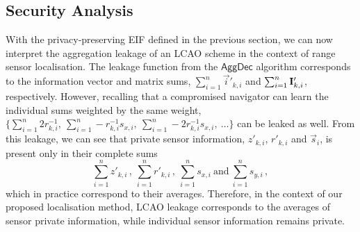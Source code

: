 \subsection{Security Analysis}\label{subsec:nonlin_fusion:security}
With the privacy-preserving EIF defined in the previous section, we can now interpret the aggregation leakage of an LCAO scheme in the context of range sensor localisation. The leakage function from the $\mathsf{AggDec}$ algorithm corresponds to the information vector and matrix sums, $\sum_{i=1}^n\vec{i}'_{k,i}$ and $\sum_{i=1}^n{{\mathbf{I}}}'_{k,i}$, respectively. However, recalling that a compromised navigator can learn the individual sums weighted by the same weight, $\{\sum_{i=1}^n2r^{-1}_{k,i},\ \sum_{i=1}^n-r^{-1}_{k,i}s_{x,i},\ \sum_{i=1}^n-2r^{-1}_{k,i}s_{x,i},\ \dots\}$ can be leaked as well. From this leakage, we can see that private sensor information, $z'_{k,i}$, $r'_{k,i}$ and $\vec{s}_i$, is present only in their complete sums
\begin{equation}
    \sum_{i=1}^nz'_{k,i}\,,\ \sum_{i=1}^nr'_{k,i}\,,\ \sum_{i=1}^ns_{x,i}\ \textrm{and}\ \sum_{i=1}^ns_{y,i}\,,\label{eqn:localisation_leakage}
\end{equation}
which in practice correspond to their averages. Therefore, in the context of our proposed localisation method, LCAO leakage corresponds to the averages of sensor private information, while individual sensor information remains private.

% 
% 

